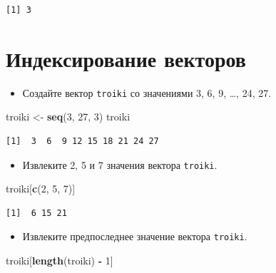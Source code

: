 \documentclass[
]{book}
\newenvironment{Shaded}{\begin{snugshade}}{\end{snugshade}}
\newcommand{\DecValTok}[1]{\textcolor[rgb]{0.00,0.00,0.81}{#1}}
\newcommand{\KeywordTok}[1]{\textcolor[rgb]{0.13,0.29,0.53}{\textbf{#1}}}
\newcommand{\NormalTok}[1]{#1}
\newcommand{\OperatorTok}[1]{\textcolor[rgb]{0.81,0.36,0.00}{\textbf{#1}}}
\newcommand{\StringTok}[1]{\textcolor[rgb]{0.31,0.60,0.02}{#1}}
\providecommand{\tightlist}{%
  \setlength{\itemsep}{0pt}\setlength{\parskip}{0pt}}
\begin{document}
\begin{verbatim}
[1] 3
\end{verbatim}

\hypertarget{solution_vec_ind}{%
\section{Индексирование векторов}\label{solution_vec_ind}}

\begin{itemize}
\tightlist
\item
  Создайте вектор \texttt{troiki} со значениями 3, 6, 9, \ldots, 24, 27.
\end{itemize}

\begin{Shaded}
\begin{Highlighting}[]
\NormalTok{troiki <-}\StringTok{ }\KeywordTok{seq}\NormalTok{(}\DecValTok{3}\NormalTok{, }\DecValTok{27}\NormalTok{, }\DecValTok{3}\NormalTok{)}
\NormalTok{troiki}
\end{Highlighting}
\end{Shaded}

\begin{verbatim}
[1]  3  6  9 12 15 18 21 24 27
\end{verbatim}

\begin{itemize}
\tightlist
\item
  Извлеките 2, 5 и 7 значения вектора \texttt{troiki}.
\end{itemize}

\begin{Shaded}
\begin{Highlighting}[]
\NormalTok{troiki[}\KeywordTok{c}\NormalTok{(}\DecValTok{2}\NormalTok{, }\DecValTok{5}\NormalTok{, }\DecValTok{7}\NormalTok{)]}
\end{Highlighting}
\end{Shaded}

\begin{verbatim}
[1]  6 15 21
\end{verbatim}

\begin{itemize}
\tightlist
\item
  Извлеките предпоследнее значение вектора \texttt{troiki}.
\end{itemize}

\begin{Shaded}
\begin{Highlighting}[]
\NormalTok{troiki[}\KeywordTok{length}\NormalTok{(troiki) }\OperatorTok{-}\StringTok{ }\DecValTok{1}\NormalTok{]}
\end{Highlighting}
\end{Shaded}
\end{document}
